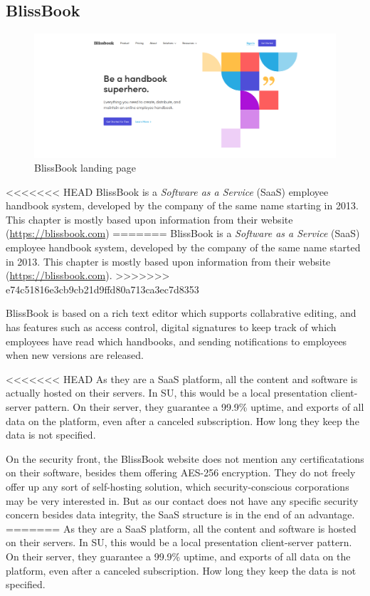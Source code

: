 \subsection{BlissBook}
\begin{figure}[h]
	\includegraphics[width=1\textwidth]{billeder/BlissBooks.png}
	\caption{BlissBook landing page}
\end{figure}
<<<<<<< HEAD
BlissBook is a \textit{Software as a Service} (SaaS) employee handbook system, developed by the company of the same name starting in 2013. %
This chapter is mostly based upon information from their website (\url{https://blissbook.com})
=======
BlissBook is a \textit{Software as a Service} (SaaS) employee handbook system, developed by the company of the same name started in 2013. %
This chapter is mostly based upon information from their website (\url{https://blissbook.com}).
>>>>>>> e74c51816e3cb9cb21d9ffd80a713ca3ec7d8353


BlissBook is based on a rich text editor which supports collabrative editing, and has features such as access control, digital signatures to keep track of which employees have read which handbooks, and sending notifications to employees when new versions are released.

<<<<<<< HEAD
As they are a SaaS platform, all the content and software is actually hosted on their servers. In SU, this would be a local presentation client-server pattern.
On their server, they guarantee a 99.9\% uptime, and exports of all data on the platform, even after a canceled subscription. How long they keep the data is not specified.

On the security front, the BlissBook website does not mention any certificatations on their software, besides them offering AES-256 encryption. %
They do not freely offer up any sort of self-hosting solution, which security-conscious corporations may be very interested in. But as our contact does not have any specific security concern besides data integrity, the SaaS structure is in the end of an advantage.
=======
As they are a SaaS platform, all the content and software is hosted on their servers. In SU, this would be a local presentation client-server pattern.
On their server, they guarantee a 99.9\% uptime, and exports of all data on the platform, even after a canceled subscription. How long they keep the data is not specified.

